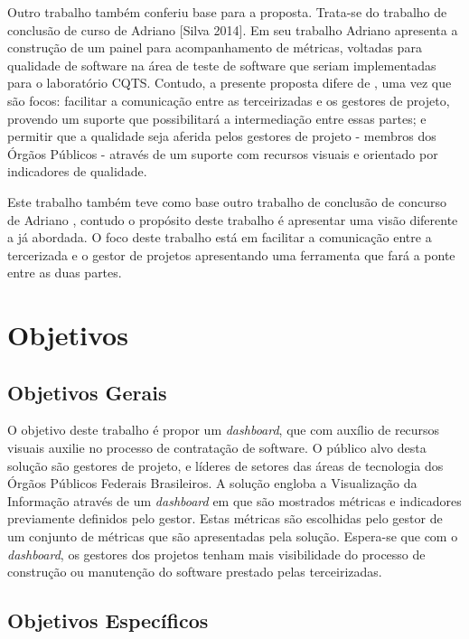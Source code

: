 Outro trabalho também conferiu base para a proposta. Trata-se do trabalho de conclusão de curso de Adriano [Silva 2014]. Em seu trabalho Adriano apresenta a construção de um painel para acompanhamento de métricas, voltadas para qualidade de software na área de teste de software que seriam implementadas para o laboratório CQTS. Contudo, a presente proposta difere de \cite{silva_painel_2014}, uma vez que são focos: facilitar a comunicação entre as terceirizadas e os gestores de projeto, provendo um suporte que possibilitará a intermediação entre essas partes; e permitir que a qualidade seja aferida pelos gestores de projeto - membros dos Órgãos Públicos - através de um suporte com recursos visuais e orientado por indicadores de qualidade.  

Este trabalho também teve como base outro trabalho de conclusão de concurso de Adriano \cite{silva_painel_2014}, contudo o propósito deste trabalho é apresentar uma visão diferente a já abordada. O foco deste trabalho está em facilitar a comunicação entre a tercerizada e o gestor de projetos apresentando uma ferramenta que fará a ponte entre as duas partes.


	\section{Objetivos}

	\subsection{Objetivos Gerais} %
	\label{sub:objetivos_gerais}
	
	O objetivo deste trabalho é propor um \textit{dashboard}, que com auxílio de recursos visuais auxilie no processo de contratação de software. O público alvo desta solução são gestores de projeto, e líderes de setores das áreas de tecnologia dos Órgãos Públicos Federais Brasileiros. A solução engloba a Visualização da Informação através de um \textit{dashboard} em que são mostrados métricas e indicadores previamente definidos pelo gestor. Estas métricas são escolhidas pelo gestor de um conjunto de métricas que são apresentadas pela solução. Espera-se que com o \textit{dashboard}, os gestores dos projetos tenham mais visibilidade do processo de construção ou manutenção do software prestado pelas terceirizadas.


	\subsection{Objetivos Específicos} %
	\label{sub:objetivos_específicos}

